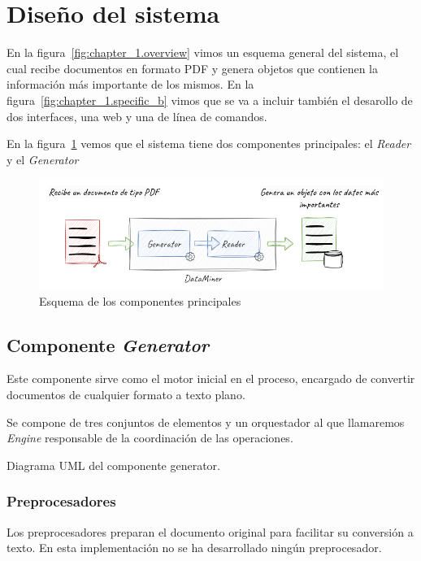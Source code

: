 \section{Diseño del sistema}

En la figura~\ref{fig:chapter_1.overview} vimos un esquema general del sistema, el cual recibe documentos en formato
PDF y genera objetos que contienen la información más importante de los mismos.
En la figura~\ref{fig:chapter_1.specific_b} vimos que se va a incluir también el desarollo de dos interfaces, una web
y una de línea de comandos.

En la figura~\ref{fig:chapter_4.overview} vemos que el sistema tiene dos componentes principales: el \textit{Reader}
y el \textit{Generator}

\begin{figure}[ht]
    \begin{center}
        \includegraphics[width=\textwidth]{./chapter/4/images/chapter_4.overview}
        \caption{Esquema de los componentes principales}
        \label{fig:chapter_4.overview}
    \end{center}
\end{figure}

\subsection*{Componente \textit{Generator}}

Este componente sirve como el motor inicial en el proceso, encargado de convertir documentos de cualquier formato a
texto plano.

Se compone de tres conjuntos de elementos y un orquestador al que llamaremos \textit{Engine} responsable de la
coordinación de las operaciones.

Diagrama UML del componente generator.

\subsubsection*{Preprocesadores}
Los preprocesadores preparan el documento original para facilitar su conversión a texto.
En esta implementación no se ha desarrollado ningún preprocesador.

